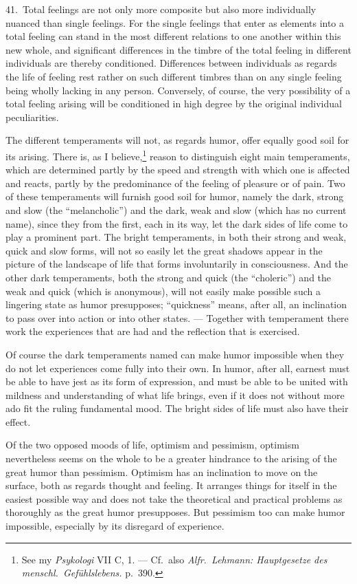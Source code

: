 \documentclass[12pt]{book}
\newcommand{\opage}[1]{\marginnote{\footnotesize\textit{[#1]}}}
\begin{document}
\opage{139}41.~Total feelings are not only more composite but also more individually
nuanced than single feelings. For the single feelings that enter as elements into a total
feeling can stand in the most different relations to one another within this new whole, and
significant differences in the timbre of the total feeling in different individuals are
thereby conditioned. Differences between individuals as regards the life of feeling rest
rather on such different timbres than on any single feeling being wholly lacking in any
person. Conversely, of course, the very possibility of a total feeling arising will be
conditioned in high degree by the original individual peculiarities.

The different temperaments will not, as regards humor, offer equally good soil for its
arising. There is, as I believe,\footnote{See my \textit{Psykologi} VII C, 1. --- Cf.\ also
\textit{Alfr.\ Lehmann: Hauptgesetze des menschl.\ Gefühlslebens.} p.~390.} reason to
distinguish eight main temperaments, which are determined partly by the speed and strength
with which one is affected and reacts, partly by the predominance of the feeling of pleasure
or of pain. Two of these temperaments will furnish good soil for humor, namely the dark, strong
and slow (the ``melancholic'') and the dark, weak and slow (which has no current name), since
they from the first, each in its way, let the dark sides of life come to play a prominent
part. The bright temperaments, in both their strong and weak, quick and slow forms, will not
so easily let the great shadows appear in the picture of the landscape of life that forms
involuntarily in consciousness. And the other dark temperaments, both the strong and quick
(the ``choleric'') and the weak and quick (which is anonymous), will not easily make possible
such a lingering state as humor presupposes; ``quickness'' means, after all, an inclination
to pass over into action or into other states. --- Together with temperament there work the
experiences that are had and the reflection that is exercised.

Of course the dark temperaments named can make humor impossible when they do not let
experiences come fully into their own. In humor, after all, earnest must be able to have jest
as its form of expression, and must be able to be united with mildness and understanding of
\opage{140}what life brings, even if it does not without more ado fit the ruling fundamental
mood. The bright sides of life must also have their effect.

Of the two opposed moods of life, optimism and pessimism, optimism nevertheless seems on the
whole to be a greater hindrance to the arising of the great humor than pessimism. Optimism has
an inclination to move on the surface, both as regards thought and feeling. It arranges things
for itself in the easiest possible way and does not take the theoretical and practical
problems as thoroughly as the great humor presupposes. But pessimism too can make humor
impossible, especially by its disregard of experience.
\end{document}
